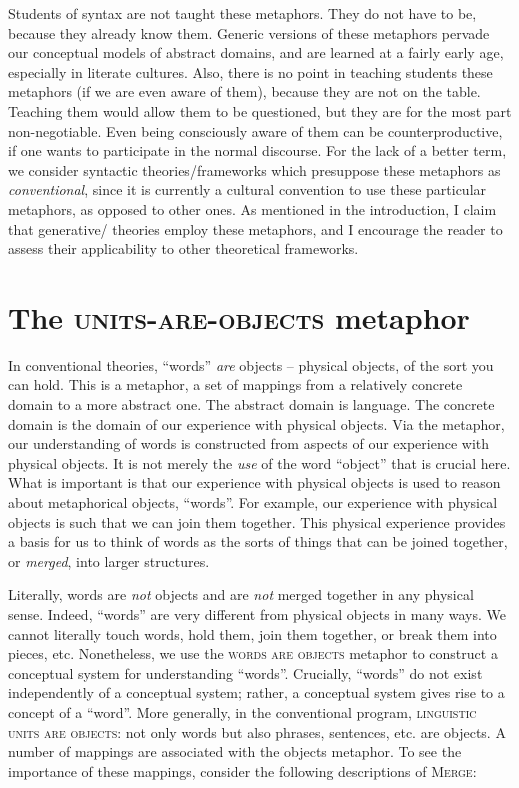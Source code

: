   Students of syntax are not taught these metaphors. They do not have to be, because they already know them. Generic versions of these metaphors pervade our conceptual models of abstract domains, and are learned at a fairly early age, especially in literate cultures. Also, there is no point in teaching students these metaphors (if we are even aware of them), because they are not on the table. Teaching them would allow them to be questioned, but they are for the most part non-negotiable. Even being consciously aware of them can be counterproductive, if one wants to participate in the normal discourse. For the lack of a better term, we consider syntactic theories/frameworks which presuppose these metaphors as \textit{conventional}, since it is currently a cultural convention to use these particular metaphors, as opposed to other ones. As mentioned in the introduction, I claim that generative/ theories employ these metaphors, and I encourage the reader to assess their applicability to other theoretical frameworks.

\section{{The} {\textsc{units-}}{\textsc{are}}{\textsc{{}-objects}}{ metaphor}} 

In conventional theories, “words” \textit{are} objects -- physical objects, of the sort you can hold. This is a metaphor, a set of mappings from a relatively concrete domain to a more abstract one. The abstract domain is language. The concrete domain is the domain of our experience with physical objects. Via the metaphor, our understanding of words is constructed from aspects of our experience with physical objects. It is not merely the \textit{use} of the word “object” that is crucial here. What is important is that our experience with physical objects is used to reason about metaphorical objects, “words”. For example, our experience with physical objects is such that we can join them together. This physical experience provides a basis for us to think of words as the sorts of things that can be joined together, or \textit{merged}, into larger structures.

  Literally, words are \textit{not} objects and are \textit{not} merged together in any physical sense. Indeed, “words” are very different from physical objects in many ways. We cannot literally touch words, hold them, join them together, or break them into pieces, etc. Nonetheless, we use the \textsc{words are objects} metaphor to construct a conceptual system for understanding “words”. Crucially, “words” do not exist independently of a conceptual system; rather, a conceptual system gives rise to a concept of a “word”. More generally, in the conventional program, \textsc{linguistic units are objects}: not only words but also phrases, sentences, etc. are objects. A number of mappings are associated with the objects metaphor. To see the importance of these mappings, consider the following descriptions of \textsc{Merge}: 

